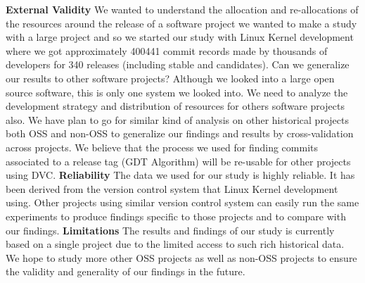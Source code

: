 \documentclass{acm_proc_article-sp}
\begin{document}
\textbf{External Validity} We wanted to understand the allocation and re-allocations of the resources around the release of a software project we wanted to make a study with a large project and so we started our study with Linux Kernel development where we got approximately 400441 commit records made by thousands of developers for 340 releases (including stable and candidates). Can we generalize our results to other software projects? Although we looked into a large open source software, this is only one system we looked into. We need to analyze the development strategy and distribution of resources for others software projects also. We have plan to go for similar kind of analysis on other historical projects both OSS and non-OSS to generalize our findings and results by cross-validation across projects. We believe that the process we used for finding commits associated to a release tag (GDT Algorithm) will be re-usable for other projects using DVC.\newline\newline
\textbf{Reliability} The data we used for our study is highly reliable. It has been derived from the version control system that Linux Kernel development using. Other projects using similar version control system can easily run the same experiments to produce findings specific to those projects and to compare with our findings.\newline\newline
\textbf{Limitations} The results and findings of our study is currently based on a single project due to the limited access to such rich historical data. We hope to study more other OSS projects as well as non-OSS projects to ensure the validity and generality of our findings in the future.
\end{document}
